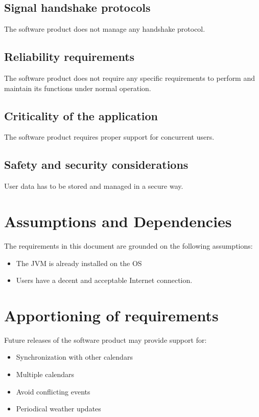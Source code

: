\documentclass[10pt,a4paper,titlepage]{article}
\begin{document}
\subsection{Signal handshake protocols}
The software product does not manage any handshake protocol. 

\subsection{Reliability requirements}
The software product does not require any specific requirements to perform and maintain its functions under normal operation. 

\subsection{Criticality of the application}
The software product requires proper support for concurrent users. 

\subsection{Safety and security considerations}
User data has to be stored and managed in a secure way.

\section{Assumptions and Dependencies}
The requirements in this document are grounded on the following assumptions:
\begin{itemize}
\item The JVM is already installed on the OS
\item Users have a decent and acceptable Internet connection.
\end{itemize}

\section{Apportioning of requirements}
Future releases of the software product may provide support for:
\begin{itemize}
\item Synchronization with other calendars
\item Multiple calendars
\item Avoid conflicting events
\item Periodical weather updates
\end{itemize}
\end{document}
